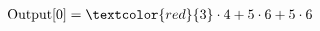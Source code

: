 \documentclass[preview]{standalone}
\begin{document}
\begin{align*}
\text{Output[0]} = \textcolor{red}{3} \cdot 4 + 5 \cdot 6 +  5 \cdot 6
\end{align*}
\end{document}
